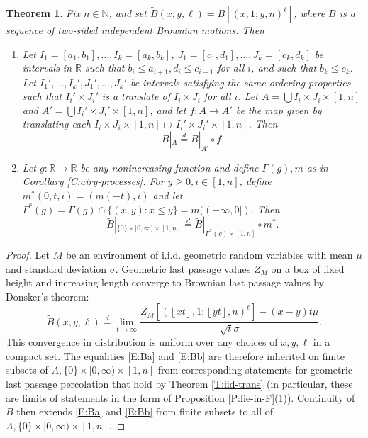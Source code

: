 \documentclass[aop, preprint]{imsart}
\theoremstyle{plain}
\newtheorem{theorem}{Theorem}[section]
\theoremstyle{definition}
\theoremstyle{plain}
\newcommand{\N}{\mathbb{N}}
\newcommand{\floor}[1]{{\left\lfloor #1 \right\rfloor}}
\newcommand{\Ga}{\Gamma}
\newcommand{\sig}{\sigma}
\newcommand{\R}{\mathds{R}}
\newcommand{\eqd}{\stackrel{d}{=}}
\newcommand{\X}{\times}
\begin{document}
\begin{theorem}
	\label{T:Brown-symmetries}
	Fix $n \in \N$, and set $\tilde B(x, y, \ell) = B[(x, 1; y, n)^\ell]$, where $B$ is a sequence of two-sided independent Brownian motions. Then
	\begin{enumerate}
		\item Let $I_1 = [a_1, b_1], \dots, I_k = [a_k, b_k]$, $J_1 = [c_1, d_1], \dots, J_k = [c_k, d_k]$ be intervals in $\R$ such that $b_i \le a_{i+1}, d_i \le c_{i-1}$ for all $i$, and such that $b_k \le c_k$. Let $I_1', \dots, I_k', J_1', \dots, J_k'$ be intervals satisfying the same ordering properties such that $I_i' \X J_i'$ is a translate of $I_i \X J_i$ for all $i$. Let $A = \bigcup I_i \X J_i \X [1, n]$ and $A' = \bigcup I_i' \X J_i' \X [1, n]$, and let $f: A \to A'$ be the map given by translating each $I_i \X J_i \X [1, n] \mapsto I_i' \X J_i' \X [1, n]$. Then
		\begin{equation}
		\label{E:Ba}
		\tilde B|_{A} \eqd \tilde B|_{A'} \circ f.
		\end{equation}
		\item Let $g:\R \to \R $ be any nonincreasing function and define $\Ga(g), m$ as in Corollary \ref{C:airy-processes}. For $y \ge 0, i \in [1, n]$, define $m^*(0, t, i) =  (m(-t), i)$ and let $\Ga^*(g) = \Ga(g) \cap \{(x, y) : x \le y\} = m((-\infty, 0])$. Then
		\begin{equation}
		\label{E:Bb}
		\tilde B|_{\{0\} \X [0, \infty) \X [1, n]} \eqd \tilde B|_{\Ga^*(g) \X [1, n]} \circ m^*.
		\end{equation}
	\end{enumerate}
\end{theorem}

\begin{proof}
	Let $M$ be an environment of i.i.d. geometric random variables with mean $\mu$ and standard deviation $\sig$. Geometric last passage values $Z_M$ on a box of fixed height and increasing length converge to Brownian last passage values by Donsker's theorem:
	$$
	\tilde B (x, y, \ell)\eqd \lim_{t \to \infty} \frac{Z_M[(\floor{x t}, 1 ; \floor{ y t}, n)^\ell] - (x - y)t \mu}{\sqrt{t} \sig}. 
	$$
	This convergence in distribution is uniform over any choices of $x, y, \ell$ in a compact set. The equalities \eqref{E:Ba} and \eqref{E:Bb} are therefore inherited on finite subsets of $A, \{0\} \X [0, \infty) \X [1, n]$ from corresponding statements for geometric last passage percolation that hold by Theorem \ref{T:iid-trans} (in particular, these are limits of statements in the form of Proposition \ref{P:lie-in-F}(1)). Continuity of $B$ then extends \eqref{E:Ba} and \eqref{E:Bb} from finite subsets to all of $A, \{0\} \X [0, \infty) \X [1, n]$.
\end{proof} 
\end{document}
